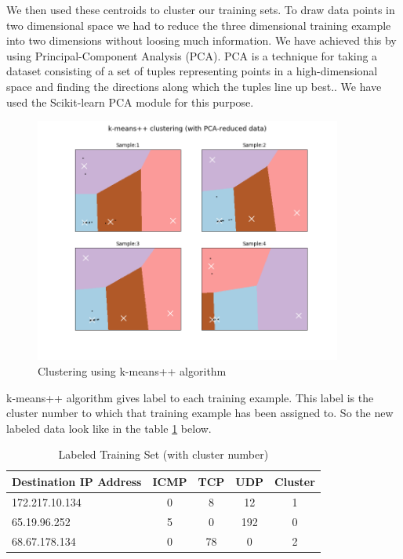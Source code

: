 \documentclass[12pt,oneside,a4paper]{article}
\begin{document}
We then used these centroids to cluster our training sets. To draw data points in two dimensional space we had to reduce the three dimensional training example into two dimensions without loosing much information. We have achieved this by using Principal-Component Analysis (PCA). PCA is a technique for taking a dataset consisting of a set of tuples representing points in a high-dimensional space and finding the directions along which the tuples line up best.\cite{pca}. We have used the Scikit-learn PCA module for this purpose.

\begin{figure}[H]
\centering
\includegraphics[width=0.90\textwidth]{kemans-clustering.png}
\caption{Clustering using k-means++ algorithm} \label{fig:k-means-clustering}
\end{figure}

k-means++ algorithm gives label to each training example. This label is the cluster number to which that training example has been assigned to. So the new labeled data look like in the table \ref{table:labeled-set} below.

\begin{table}[H]
\centering
  \begin{tabular}{| l | c | c | c | c |}
    \hline
    {Destination IP Address}  &ICMP  &TCP &UDP  &Cluster \\
    \hline
    172.217.10.134  & 0     & 8     & 12  &1  \\ \hline
    65.19.96.252    & 5     & 0     & 192 &0  \\ \hline
    68.67.178.134   & 0     & 78    & 0   &2  \\ \hline
  \end{tabular}
\caption{Labeled Training Set (with cluster number)} \label{table:labeled-set}
\end{table}
\end{document}
